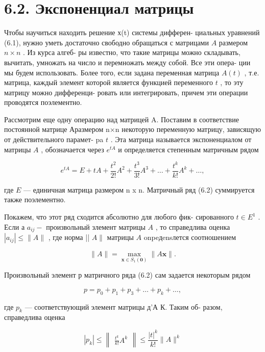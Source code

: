 \documentclass[8pt]{extarticle}
\begin{document}
\section*{6.2. Экспоненциал матрицы}

Чтобы научиться находить решение х(t) системы дифферен- циальных уравнений (6.1), нужно уметь достаточно свободно обращаться с матрицами \(A\) размером \(n \times  n\) . Из курса алгеб- ры известно, что такие матрицы можно складывать, вычитать, умножать на число и перемножать между собой. Все эти опера- ции мы будем использовать. Более того, если задана переменная матрица \(A\left( t\right)\) , т.е. матрица, каждый элемент которой является функцией переменного \(t\) , то эту матрицу можно дифференци- ровать или интегрировать, причем эти операции проводятся поэлементно.

Рассмотрим еще одну операцию над матрицей A. Поставим в соответствие постоянной матрице Аразмером n×n некоторую переменную матрицу, зависящую от действительного парамет- pa \(t\) . Эта матрица называется экспоненциалом от матрицы \(A\) , обозначается через \({e}^{tA}\) и определяется степенным матричным рядом

\[
{e}^{tA} = E + {tA} + \frac{{t}^{2}}{2!}{A}^{2} + \frac{{t}^{3}}{3!}{A}^{3} + \ldots  + \frac{{t}^{k}}{k!}{A}^{k} + \ldots , \tag{6.2}
\]

где \(E\) — единичная матрица размером n x n. Матричный ряд (6.2) суммируется также поэлементно.

Покажем, что этот ряд сходится абсолютно для любого фик- сированного \(t \in  {E}^{1}\) . Если а \({a}_{ij} -\) произвольный злемент матрицы \(A\) , то справедлива оценка \(\left| {a}_{ij}\right|  \leq  \parallel A\parallel\) , где норма || \(A\parallel\) матрицы \(A\) onpeдensлется соотношением

\[
\parallel A\parallel  = \mathop{\max }\limits_{{\mathbf{x} \in  {S}_{1}\left( \mathbf{0}\right) }}\parallel A\mathbf{x}\parallel .
\]

Произвольный элемент р матричного ряда (6.2) сам задается некоторым рядом

\[
p = {p}_{0} + {p}_{1} + {p}_{3} + \ldots  + {p}_{k} + \ldots , \tag{6.3}
\]

где \({p}_{k}\) — соответствующий элемент матрицы д’А К. Таким об- разом, справедлива оценка

\[
\left| {p}_{k}\right|  \leq  \left\lVert \begin{array}{c} {\frac{{t}^{k}}{k!}{A}^{k}} \end{array} \right\rVert \leq  \frac{{\left| t\right| }^{k}}{k!}\parallel A{\parallel }^{k}
\]
\end{document}
